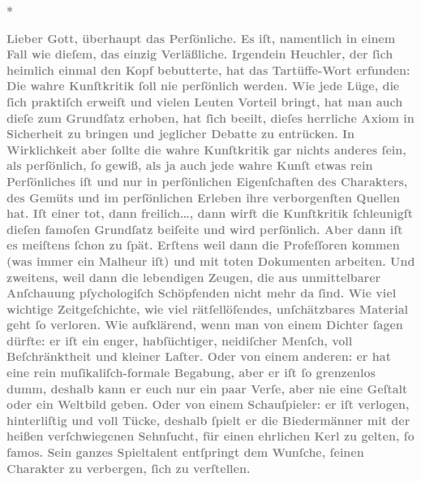 \pstart
           \centering{}\textcolor{gray}{\textbf{*}}\pend
           
\pstart
           \textcolor{gray}{\textbf{Lieber Gott, überhaupt das Perſönliche. Es iſt, namentlich in
                  einem Fall wie dieſem, das einzig Verläßliche. Irgendein Heuchler, der{ }ſich
                  heimlich einmal den Kopf bebutterte, hat das Tartüffe-Wort erfunden: Die wahre Kunſtkritik{ }ſoll nie
                  perſönlich werden. Wie jede Lüge, die{ }ſich praktiſch erweiſt und vielen Leuten
                  Vorteil bringt, hat man auch dieſe zum Grundſatz erhoben, hat{ }ſich beeilt, dieſes
                  herrliche Axiom in Sicherheit zu bringen und jeglicher Debatte zu entrücken. In
                  Wirklichkeit aber{ }ſollte die wahre Kunſtkritik gar nichts anderes{ }ſein, als
                  perſönlich,{ }ſo gewiß, als ja auch jede wahre Kunſt etwas rein Perſönliches iſt und
                  nur in perſönlichen Eigenſchaften des Charakters, des Gemüts und im perſönlichen
                  Erleben ihre verborgenſten Quellen hat. Iſt einer tot, dann freilich{\dots}, dann wirft die Kunſtkritik{ }ſchleunigſt dieſen
                  famoſen Grundſatz beiſeite und wird perſönlich. Aber dann iſt es meiſtens{ }ſchon zu{ }ſpät. Erſtens weil dann die Profeſſoren kommen (was immer ein Malheur iſt) und mit
                  toten Dokumenten arbeiten. Und zweitens, weil dann die lebendigen Zeugen, die aus
                  unmittelbarer Anſchauung pſychologiſch Schöpfenden nicht mehr da{ }ſind. Wie viel
                  wichtige Zeitgeſchichte, wie viel rätſellöſendes, unſchätzbares Material geht{ }ſo
                  verloren. Wie aufklärend, wenn man von einem Dichter{ }ſagen dürfte: er iſt ein
                  enger, habſüchtiger, neidiſcher Menſch, voll Beſchränktheit und kleiner Laſter.
                  Oder von einem anderen: er hat eine rein muſikaliſch-formale Begabung, aber er iſt{ }ſo grenzenlos dumm, deshalb kann er euch nur ein paar Verſe, aber nie eine Geſtalt
                  oder ein Weltbild geben. Oder von einem Schauſpieler: er iſt verlogen,
                  hinterliſtig und voll Tücke, deshalb{ }ſpielt er die Biedermänner mit der heißen
                  verſchwiegenen Sehnſucht, für einen ehrlichen Kerl zu gelten,{ }ſo famos. Sein
                  ganzes Spieltalent entſpringt dem Wunſche,{ }ſeinen Charakter zu verbergen,{ }ſich zu
                  verſtellen.}}\pend
           
